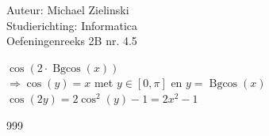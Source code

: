 \documentclass[a4paper]{article}
\begin{document}
\noindent \large Auteur: Michael Zielinski \\
\noindent \large Studierichting: Informatica \\
\noindent \large Oefeningenreeks 2B nr. 4.5 \\

\medskip

\normalsize

$\cos(2 \cdot \operatorname{Bgcos}(x))$ \\

$\Rightarrow \cos(y) = x$ met $y \in [0, \pi]$ en $y = \operatorname{Bgcos}(x)$ \\

$\cos(2y) = 2\cos^2(y) - 1 = 2x^2 - 1$\\

\begin{thebibliography}{999}
\end{thebibliography}
\end{document}
